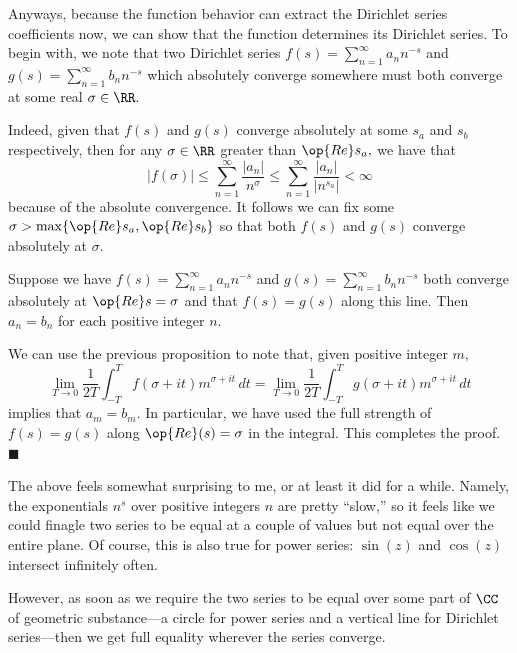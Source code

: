Anyways, because the function behavior can extract the Dirichlet series coefficients now, we can show that the function determines its Dirichlet series. To begin with, we note that two Dirichlet series $f(s)=\sum_{n=1}^\infty a_nn^{-s}$ and $g(s)=\sum_{n=1}^\infty b_nn^{-s}$ which absolutely converge somewhere must both converge at some real $\sigma\in\RR.$

Indeed, given that $f(s)$ and $g(s)$ converge absolutely at some $s_a$ and $s_b$ respectively, then for any $\sigma\in\RR$ greater than $\op{Re}s_a,$ we have that
\[|f(\sigma)|\le\sum_{n=1}^\infty\frac{|a_n|}{n^\sigma}\le\sum_{n=1}^\infty\frac{|a_n|}{\left|n^{s_a}\right|}<\infty\]
because of the absolute convergence. It follows we can fix some $\sigma>\max\{\op{Re}s_a,\op{Re}s_b\}$ so that both $f(s)$ and $g(s)$ converge absolutely at $\sigma.$
\begin{proposition}
    Suppose we have $f(s)=\sum_{n=1}^\infty a_nn^{-s}$ and $g(s)=\sum_{n=1}^\infty b_nn^{-s}$ both converge absolutely at $\op{Re}s=\sigma$ and that $f(s)=g(s)$ along this line. Then $a_n=b_n$ for each positive integer $n.$
\end{proposition}
We can use the previous proposition to note that, given positive integer $m,$
\[\lim_{T\to0}\frac1{2T}\int_{-T}^Tf(\sigma+it)m^{\sigma+it}\,dt=\lim_{T\to0}\frac1{2T}\int_{-T}^Tg(\sigma+it)m^{\sigma+it}\,dt\]
implies that $a_m=b_m.$ In particular, we have used the full strength of $f(s)=g(s)$ along $\op{Re}(s)=\sigma$ in the integral. This completes the proof. $\blacksquare$

The above feels somewhat surprising to me, or at least it did for a while. Namely, the exponentials $n^s$ over positive integers $n$ are pretty ``slow,'' so it feels like we could finagle two series to be equal at a couple of values but not equal over the entire plane. Of course, this is also true for power series: $\sin(z)$ and $\cos(z)$ intersect infinitely often.

However, as soon as we require the two series to be equal over some part of $\CC$ of geometric substance---a circle for power series and a vertical line for Dirichlet series---then we get full equality wherever the series converge.

